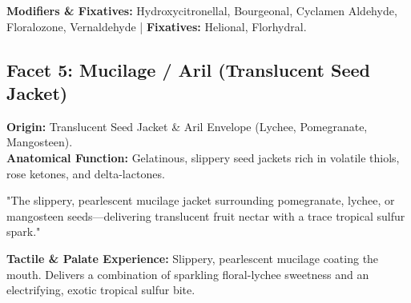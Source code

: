 \documentclass[11pt,a4paper]{article}
\begin{document}
\textbf{Modifiers \& Fixatives:} Hydroxycitronellal, Bourgeonal, Cyclamen Aldehyde, Floralozone, Vernaldehyde | \textbf{Fixatives:} Helional, Florhydral.

\newpage

\subsection{Facet 5: Mucilage / Aril (Translucent Seed Jacket)}

\begin{botanicalbox}
\textbf{Origin:} Translucent Seed Jacket \& Aril Envelope (Lychee, Pomegranate, Mangosteen).\\
\textbf{Anatomical Function:} Gelatinous, slippery seed jackets rich in volatile thiols, rose ketones, and delta-lactones.
\end{botanicalbox}

\begin{sensoryquote}
"The slippery, pearlescent mucilage jacket surrounding pomegranate, lychee, or mangosteen seeds---delivering translucent fruit nectar with a trace tropical sulfur spark."
\end{sensoryquote}

\begin{flavourbox}
\textbf{Tactile \& Palate Experience:} Slippery, pearlescent mucilage coating the mouth. Delivers a combination of sparkling floral-lychee sweetness and an electrifying, exotic tropical sulfur bite.
\end{flavourbox}

\begin{table}[htbp]
\centering
\caption{Primary Impact Actors for Facet 5 (Mucilage / Aril)}
\vspace{0.3em}
\end{table}
\end{document}
